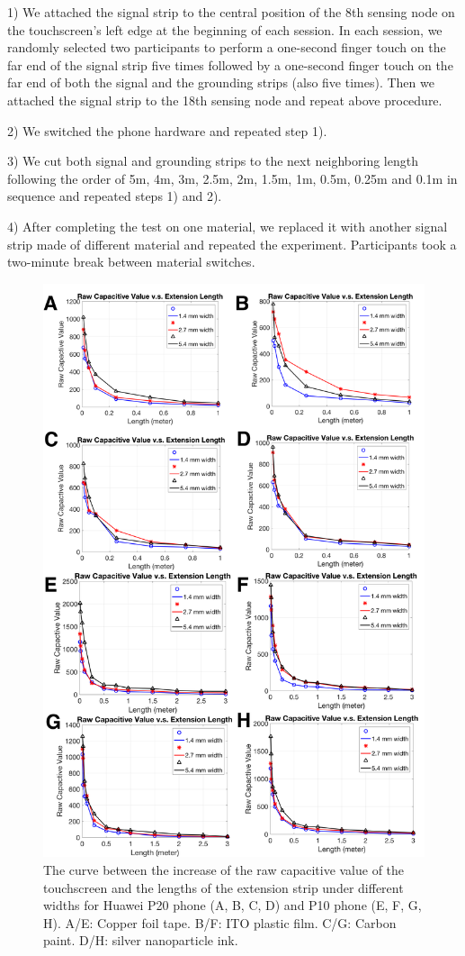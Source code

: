 1) We attached the signal strip to the central position of the 8th sensing node on the touchscreen's left edge at the beginning of each session. In each session, we randomly selected two participants to perform a one-second finger touch on the far end of the signal strip five times followed by a one-second finger touch on the far end of both the signal and the grounding strips (also five times). Then we attached the signal strip to the 18th sensing node and repeat above procedure. 

2) We switched the phone hardware and repeated step 1).

3) We cut both signal and grounding strips to the next neighboring length following the order of 5m, 4m, 3m, 2.5m, 2m, 1.5m, 1m, 0.5m, 0.25m and 0.1m in sequence and repeated steps 1) and 2).

4) After completing the test on one material, we replaced it with another signal strip made of different material and repeated the experiment. Participants took a two-minute break between material switches.

\begin{figure}[ht]
	\centering
	  \includegraphics[width=0.65\columnwidth]{figures/length.png}
	  \caption{The curve between the increase of the raw capacitive value of the touchscreen and the lengths of the extension strip under different widths for Huawei P20 phone (A, B, C, D) and P10 phone (E, F, G, H). A/E: Copper foil tape. B/F: ITO plastic film. C/G: Carbon paint. D/H: silver nanoparticle ink.}
	  \label{fig:length}
\end{figure}


